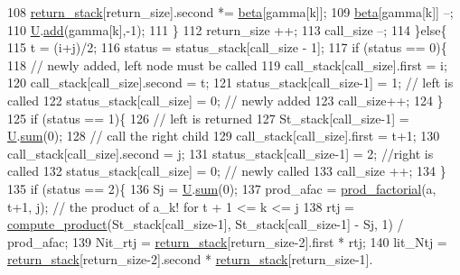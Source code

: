 \begin{DoxyCode}
108         \hyperlink{namespacehelper__vars_a6d2100c373830cacd232319a9958652d}{return\_stack}[return\_size].second *= \hyperlink{classb__graph__encoder_ae54d76cc4cee399d98951f870897a144}{beta}[gamma[k]];
109         \hyperlink{classb__graph__encoder_ae54d76cc4cee399d98951f870897a144}{beta}[gamma[k]] --;
110         \hyperlink{classb__graph__encoder_ac810138443002a2b2cf579ced2dc34ce}{U}.\hyperlink{classreverse__fenwick__tree_a942d7f49b37e53ebfec3076d177691d7}{add}(gamma[k],-1);
111       \}
112       return\_size ++;
113       call\_size --;
114     \}\textcolor{keywordflow}{else}\{
115       t = (i+j)/2;
116       status = status\_stack[call\_size - 1];
117       \textcolor{keywordflow}{if} (status == 0)\{
118         \textcolor{comment}{// newly added, left node must be called}
119         call\_stack[call\_size].first = i;
120         call\_stack[call\_size].second = t;
121         status\_stack[call\_size-1] = 1; \textcolor{comment}{// left is called}
122         status\_stack[call\_size] = 0; \textcolor{comment}{// newly added}
123         call\_size++;
124       \}
125       \textcolor{keywordflow}{if} (status == 1)\{
126         \textcolor{comment}{// left is returned}
127         St\_stack[call\_size-1] = \hyperlink{classb__graph__encoder_ac810138443002a2b2cf579ced2dc34ce}{U}.\hyperlink{classreverse__fenwick__tree_a672731fd6395b4853430073a099a80e6}{sum}(0);
128         \textcolor{comment}{// call the right child}
129         call\_stack[call\_size].first = t+1;
130         call\_stack[call\_size].second = j;
131         status\_stack[call\_size-1] = 2; \textcolor{comment}{//right is called}
132         status\_stack[call\_size] = 0;  \textcolor{comment}{// newly called}
133         call\_size ++;
134       \}
135       \textcolor{keywordflow}{if} (status == 2)\{
136         Sj = \hyperlink{classb__graph__encoder_ac810138443002a2b2cf579ced2dc34ce}{U}.\hyperlink{classreverse__fenwick__tree_a672731fd6395b4853430073a099a80e6}{sum}(0);
137         prod\_afac = \hyperlink{compression__helper_8cpp_a86d8a20e022dc06b23df3b08ac10b7d1}{prod\_factorial}(a, t+1, j); \textcolor{comment}{// the product of a\_k! for t + 1 <= k <= j}
138         rtj = \hyperlink{compression__helper_8cpp_ae2afb43aabe50f7d42aae8f82b5a35f4}{compute\_product}(St\_stack[call\_size-1], St\_stack[call\_size-1] - Sj, 1) / 
      prod\_afac;
139         Nit\_rtj = \hyperlink{namespacehelper__vars_a6d2100c373830cacd232319a9958652d}{return\_stack}[return\_size-2].first * rtj;
140         lit\_Ntj = \hyperlink{namespacehelper__vars_a6d2100c373830cacd232319a9958652d}{return\_stack}[return\_size-2].second * \hyperlink{namespacehelper__vars_a6d2100c373830cacd232319a9958652d}{return\_stack}[return\_size-1].

\end{DoxyCode}
